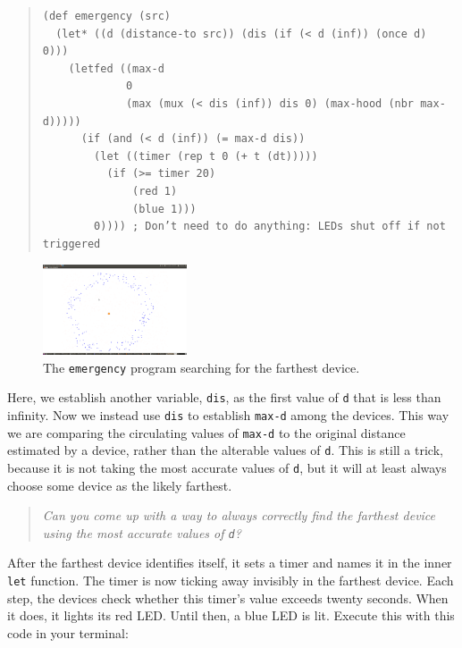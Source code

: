 \documentclass{article}
\newcommand\problem[1]{\begin{quote}{\em #1}\end{quote}}
\newcommand\var[1]{{\tt #1}}
\begin{document}
\begin{quote}
\begin{verbatim}
(def emergency (src) 
  (let* ((d (distance-to src)) (dis (if (< d (inf)) (once d) 0))) 
    (letfed ((max-d 
             0 
             (max (mux (< dis (inf)) dis 0) (max-hood (nbr max-d)))))
      (if (and (< d (inf)) (= max-d dis))
        (let ((timer (rep t 0 (+ t (dt)))))
          (if (>= timer 20) 
              (red 1) 
              (blue 1)))
        0)))) ; Don’t need to do anything: LEDs shut off if not triggered
\end{verbatim}
\end{quote}

\begin{figure}
  \includegraphics[width=0.38\textwidth]{figures/emergency.png}
  \caption{The \var{emergency} program searching for the farthest device.}
  \vspace{-0.5cm}
  \label{f:emergency}
\end{figure}

Here, we establish another variable, \var{dis}, as the first value of
\var{d} that is less than infinity.  Now we instead use \var{dis} to
establish \var{max-d} among the devices.  This way we are comparing
the circulating values of \var{max-d} to the original distance
estimated by a device, rather than the alterable values of \var{d}.
This is still a trick, because it is not taking the most accurate
values of \var{d}, but it will at least always choose some device as
the likely farthest.

\problem{Can you come up with a way to always correctly find the
  farthest device using the most accurate values of \var{d}?}

After the farthest device identifies itself, it sets a timer and names
it in the inner \var{let} function.  The timer is now ticking away
invisibly in the farthest device.  Each step, the devices check
whether this timer's value exceeds twenty seconds.  When it does, it
lights its red LED.  Until then, a blue LED is lit. Execute this with
this code in your terminal:
\end{document}
